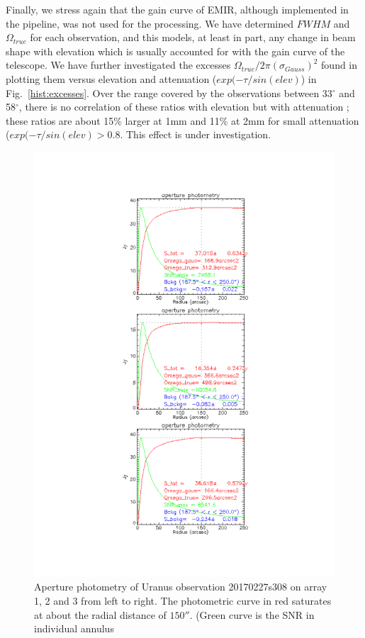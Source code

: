 Finally, we stress again that the gain curve of EMIR, although implemented in the pipeline, was not used for the processing.
We have determined $FWHM$ and $\Omega_{true}$  for each observation, and this
models, at least in part, any change in beam shape with elevation which is usually accounted
for with the gain curve of the telescope. We have further investigated
the excesses $\Omega_{true} / 2 \pi (\sigma_{Gauss})^2$ found in plotting them versus elevation
and attenuation ($exp(-\tau/sin(elev)$) in Fig.~\ref{hist:excesses}.
Over the range covered by the observations between 33$^{\circ}$ and 58$^{\circ}$, there is no correlation
of these ratios with elevation  but  with  attenuation ; these ratios are about 15\% larger at 1mm and 11\%
at 2mm for small attenuation ($exp(-\tau/sin(elev) > 0.8$. This effect is under investigation. 

\begin{figure}
\begin{center}
  \includegraphics[clip, angle=0, scale=0.4]{Figures/Uranus_s308.pdf}
  \caption{Aperture photometry of Uranus observation 20170227s308  on array 1, 2 and 3 from left to right.
    The photometric curve in red saturates at about the radial distance of  $150''$. (Green curve is the SNR in individual annulus}
\label{fig:PhAp}
\end{center}
\end{figure}







